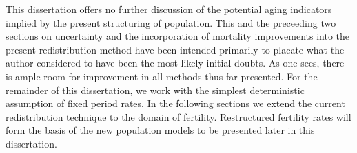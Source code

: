 This dissertation offers no further discussion of the
potential aging indicators implied by the present structuring of population.
This and the preceeding two sections on uncertainty and the incorporation of
mortality improvements into the present redistribution method have been intended
primarily to placate what the author considered to have been the most likely
initial doubts. As one sees, there is ample room for improvement in all methods
thus far presented. For the remainder of this dissertation,
we work with the simplest deterministic assumption of fixed period rates.
In the following sections we extend the current redistribution technique to the
domain of fertility. Restructured fertility rates will form the basis of the new
population models to be presented later in this dissertation.
\FloatBarrier
